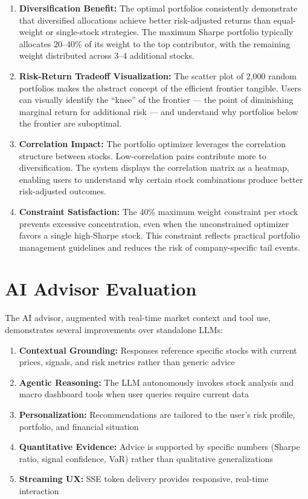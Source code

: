 \documentclass[12pt, a4paper, oneside]{report}
\begin{document}
\begin{enumerate}[nosep]
    \item \textbf{Diversification Benefit:} The optimal portfolios consistently demonstrate that diversified allocations achieve better risk-adjusted returns than equal-weight or single-stock strategies. The maximum Sharpe portfolio typically allocates 20--40\% of its weight to the top contributor, with the remaining weight distributed across 3--4 additional stocks.

    \item \textbf{Risk-Return Tradeoff Visualization:} The scatter plot of 2,000 random portfolios makes the abstract concept of the efficient frontier tangible. Users can visually identify the ``knee'' of the frontier --- the point of diminishing marginal return for additional risk --- and understand why portfolios below the frontier are suboptimal.

    \item \textbf{Correlation Impact:} The portfolio optimizer leverages the correlation structure between stocks. Low-correlation pairs contribute more to diversification. The system displays the correlation matrix as a heatmap, enabling users to understand why certain stock combinations produce better risk-adjusted outcomes.

    \item \textbf{Constraint Satisfaction:} The 40\% maximum weight constraint per stock prevents excessive concentration, even when the unconstrained optimizer favors a single high-Sharpe stock. This constraint reflects practical portfolio management guidelines and reduces the risk of company-specific tail events.
\end{enumerate}

\section{AI Advisor Evaluation}
\label{sec:results_ai}

The AI advisor, augmented with real-time market context and tool use, demonstrates several improvements over standalone LLMs:

\begin{enumerate}[nosep]
    \item \textbf{Contextual Grounding:} Responses reference specific stocks with current prices, signals, and risk metrics rather than generic advice
    \item \textbf{Agentic Reasoning:} The LLM autonomously invokes stock analysis and macro dashboard tools when user queries require current data
    \item \textbf{Personalization:} Recommendations are tailored to the user's risk profile, portfolio, and financial situation
    \item \textbf{Quantitative Evidence:} Advice is supported by specific numbers (Sharpe ratio, signal confidence, VaR) rather than qualitative generalizations
    \item \textbf{Streaming UX:} SSE token delivery provides responsive, real-time interaction
\end{enumerate}
\end{document}
